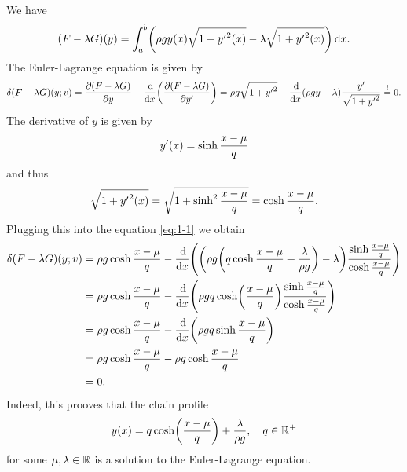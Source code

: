\documentclass{exercise}
\begin{document}
	We have
	\[
		\parentheses*{F - \lambda G}\parentheses*{y} = \int_a^b \parentheses*{\rho gy\parentheses*{x}\sqrt{1 + {y'}^2\parentheses*{x}} - \lambda\sqrt{1 + {y'}^2\parentheses*{x}}}\d x.
	\]
	The Euler-Lagrange equation is given by
	\begin{equation}\label{eq:1-1}
		\delta\parentheses*{F - \lambda G}\parentheses*{y; v} = \frac{\partial\parentheses*{F - \lambda G}}{\partial y} - \frac{\d}{\d x}\parentheses*{\frac{\partial\parentheses*{F - \lambda G}}{\partial y'}} = \rho g\sqrt{1 + {y'}^2} - \frac{\d}{\d x}\parentheses*{\rho gy - \lambda}\frac{y'}{\sqrt{1 + {y'}^2}} \stackrel{!}{=} 0.
	\end{equation}
	The derivative of \(y\) is given by
	\[
		y'\parentheses*{x} = \sinh\frac{x - \mu}{q}
	\]
	and thus
	\[
		\sqrt{1 + {y'}^2\parentheses*{x}} = \sqrt{1 + \sinh^2 \frac{x - \mu}{q}} = \cosh\frac{x - \mu}{q}.
	\]
	Plugging this into the equation \eqref{eq:1-1} we obtain
	\begin{align*}
		\delta\parentheses*{F - \lambda G}\parentheses*{y; v} &= \rho g\cosh\frac{x - \mu}{q} - \frac{\d}{\d x}\parentheses*{\parentheses*{\rho g\parentheses*{q\cosh\frac{x - \mu}{q} + \frac{\lambda}{\rho g}} - \lambda}\frac{\sinh\frac{x - \mu}{q}}{\cosh\frac{x - \mu}{q}}}\\
		&= \rho g\cosh\frac{x - \mu}{q} - \frac{\d}{\d x}\parentheses*{\rho gq\cosh\parentheses*{\frac{x - \mu}q}\frac{\sinh\frac{x - \mu}{q}}{\cosh\frac{x - \mu}{q}}}\\
		&= \rho g\cosh\frac{x - \mu}{q} - \frac{\d}{\d x}\parentheses*{\rho gq\sinh\frac{x - \mu}{q}}\\
		&= \rho g\cosh\frac{x - \mu}{q} - \rho g\cosh\frac{x - \mu}{q}\\
		&= 0.
	\end{align*}
	Indeed, this prooves that the chain profile
	\[
		y\parentheses*{x} = q\cosh\parentheses*{\frac{x - \mu}{q}} + \frac{\lambda}{\rho g}, \quad q \in \R^+
	\]
	for some \(\mu, \lambda \in \mathbb{R}\) is a solution to the Euler-Lagrange equation.


	\section{}
\end{document}
